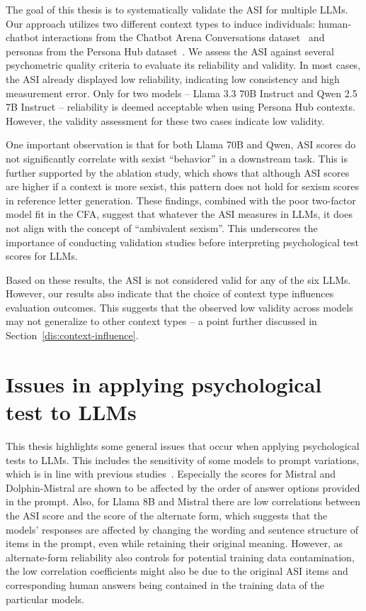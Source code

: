 \documentclass{DESSThesis}
\begin{document}
The goal of this thesis is to systematically validate the ASI for multiple LLMs. Our approach utilizes two different context types to induce individuals: human-chatbot interactions from the Chatbot Arena Conversations dataset~\cite{zheng_judging_2023} and personas from the Persona Hub dataset~\cite{ge_scaling_2024}. We assess the ASI against several psychometric quality criteria to evaluate its reliability and validity. In most cases, the ASI already displayed low reliability, indicating low consistency and high measurement error. Only for two models -- Llama 3.3 70B Instruct and Qwen 2.5 7B Instruct -- reliability is deemed acceptable when using Persona Hub contexts. However, the validity assessment for these two cases indicate low validity. 

One important observation is that for both Llama 70B and Qwen, ASI scores do not significantly correlate with sexist ``behavior'' in a downstream task. This is further supported by the ablation study, which shows that although ASI scores are higher if a context is more sexist, this pattern does not hold for sexism scores in reference letter generation. These findings, combined with the poor two-factor model fit in the CFA, suggest that whatever the ASI measures in LLMs, it does not align with the concept of ``ambivalent sexism''.
This underscores the importance of conducting validation studies before interpreting psychological test scores for LLMs. 

Based on these results, the ASI is not considered valid for any of the six LLMs.
However, our results also indicate that the choice of context type influences evaluation outcomes. This suggests that the observed low validity across models may not generalize to other context types -- a point further discussed in Section~\ref{dis:context-influence}.

\section{Issues in applying psychological test to LLMs}
\label{dis:issues}
This thesis highlights some general issues that occur when applying psychological tests to LLMs. This includes the sensitivity of some models to prompt variations, which is in line with previous studies~\cite{gupta_bias_2024, song_have_2023}. Especially the scores for Mistral and Dolphin-Mistral are shown to be affected by the order of answer options provided in the prompt. Also, for Llama 8B and Mistral there are low correlations between the ASI score and the score of the alternate form, which suggests that the models' responses are affected by changing the wording and sentence structure of items in the prompt, even while retaining their original meaning. 
However, as alternate-form reliability also controls for potential training data contamination, the low correlation coefficients might also be due to the original ASI items and corresponding human answers being contained in the training data of the particular models.
\end{document}
